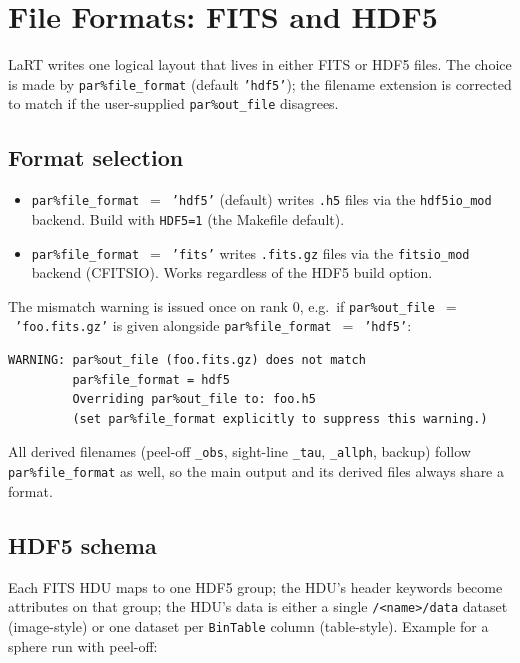 \documentclass[english,a4paper]{my_memo}
\newcommand{\parm}[1]{\texttt{par\%#1}}
\begin{document}
\section{File Formats: FITS and HDF5}
\label{sec:fileformats}

LaRT writes one logical layout that lives in either FITS or HDF5 files.
The choice is made by \parm{file\_format} (default \texttt{'hdf5'}); the
filename extension is corrected to match if the user-supplied
\parm{out\_file} disagrees.

\subsection{Format selection}

\begin{itemize}
  \item \parm{file\_format}~$=$~\texttt{'hdf5'} (default) writes
        \texttt{.h5} files via the \texttt{hdf5io\_mod} backend.
        Build with \texttt{HDF5=1} (the Makefile default).
  \item \parm{file\_format}~$=$~\texttt{'fits'} writes \texttt{.fits.gz}
        files via the \texttt{fitsio\_mod} backend (CFITSIO).
        Works regardless of the HDF5 build option.
\end{itemize}

The mismatch warning is issued once on rank 0, e.g.\ if
\parm{out\_file}~$=$~\texttt{'foo.fits.gz'} is given alongside
\parm{file\_format}~$=$~\texttt{'hdf5'}:

\begin{verbatim}
WARNING: par%out_file (foo.fits.gz) does not match
         par%file_format = hdf5
         Overriding par%out_file to: foo.h5
         (set par%file_format explicitly to suppress this warning.)
\end{verbatim}

All derived filenames (peel-off \texttt{\_obs}, sight-line \texttt{\_tau},
\texttt{\_allph}, backup) follow \parm{file\_format} as well, so the main
output and its derived files always share a format.

\subsection{HDF5 schema}

Each FITS HDU maps to one HDF5 group; the HDU's header keywords become
attributes on that group; the HDU's data is either a single
\texttt{/<name>/data} dataset (image-style) or one dataset per
\texttt{BinTable} column (table-style).  Example for a sphere run with
peel-off:
\end{document}
